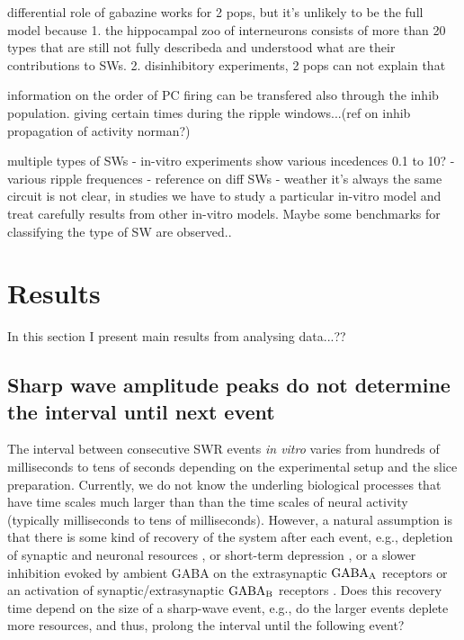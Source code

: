     differential role of gabazine works for 2 pops, but it's unlikely to be the full model
    because 1. the hippocampal zoo of interneurons consists of more than 20 types that are still not 
    fully describeda and understood what are their contributions to SWs.
    2. disinhibitory experiments, 2 pops can not explain that 

information on the order of PC firing can be transfered also through the inhib population.
giving certain times during the ripple windows...(ref on inhib propagation of activity norman?)

multiple types of SWs
  - in-vitro experiments show various incedences 0.1 to 10?
  - various ripple frequences
  - reference on diff SWs
  - weather it's always the same circuit is not clear, in studies we have to study a particular 
  in-vitro model and treat carefully results from other in-vitro models. Maybe some benchmarks for 
  classifying the type of SW are observed..


\section{Results}
  In this section I present main results from analysing data...??

  \subsection{Sharp wave amplitude peaks do not determine the interval until next event }
    \label{sec:swr_amp-int}

    The interval between consecutive SWR events \textit{in vitro} varies from
    hundreds of milliseconds to tens of seconds depending on the experimental
    setup and the slice preparation. Currently, we do not know the underling
    biological processes that have time scales much larger than than the time
    scales of neural activity (typically milliseconds to tens of milliseconds).
    However, a natural assumption is that there is some kind of recovery of the
    system after each event, e.g., depletion of synaptic and neuronal resources
    \citep{Cohen2004, Jones2007}, or short-term depression \citep{Romani2015,
    Kohus2016}, or a slower inhibition evoked by ambient GABA on the
    extrasynaptic $\rm GABA_A$ receptors \citep{Brown1978, Ben1994} or an
    activation of synaptic/extrasynaptic $\rm GABA_B$ receptors
    \citep{Scanziani2000, Hollnagel2014, Lang2014}. Does this recovery time
    depend on the size of a sharp-wave event, e.g., do the larger events
    deplete more resources, and thus, prolong the interval until the following
    event?

